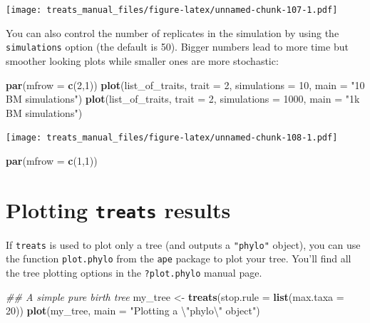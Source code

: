 \documentclass[
]{book}
\newenvironment{Shaded}{\begin{snugshade}}{\end{snugshade}}
\newcommand{\CharTok}[1]{\textcolor[rgb]{0.31,0.60,0.02}{#1}}
\newcommand{\CommentTok}[1]{\textcolor[rgb]{0.56,0.35,0.01}{\textit{#1}}}
\newcommand{\DataTypeTok}[1]{\textcolor[rgb]{0.13,0.29,0.53}{#1}}
\newcommand{\DecValTok}[1]{\textcolor[rgb]{0.00,0.00,0.81}{#1}}
\newcommand{\KeywordTok}[1]{\textcolor[rgb]{0.13,0.29,0.53}{\textbf{#1}}}
\newcommand{\NormalTok}[1]{#1}
\newcommand{\StringTok}[1]{\textcolor[rgb]{0.31,0.60,0.02}{#1}}
\begin{document}
\texttt{[image: treats\_manual\_files/figure-latex/unnamed-chunk-107-1.pdf]}

You can also control the number of replicates in the simulation by using the \texttt{simulations} option (the default is 50).
Bigger numbers lead to more time but smoother looking plots while smaller ones are more stochastic:

\begin{Shaded}
\begin{Highlighting}[]
\KeywordTok{par}\NormalTok{(}\DataTypeTok{mfrow =} \KeywordTok{c}\NormalTok{(}\DecValTok{2}\NormalTok{,}\DecValTok{1}\NormalTok{))}
\KeywordTok{plot}\NormalTok{(list\_of\_traits, }\DataTypeTok{trait =} \DecValTok{2}\NormalTok{, }\DataTypeTok{simulations =} \DecValTok{10}\NormalTok{, }\DataTypeTok{main =} \StringTok{"10 BM simulations"}\NormalTok{)}
\KeywordTok{plot}\NormalTok{(list\_of\_traits, }\DataTypeTok{trait =} \DecValTok{2}\NormalTok{, }\DataTypeTok{simulations =} \DecValTok{1000}\NormalTok{, }\DataTypeTok{main =} \StringTok{"1k BM simulations"}\NormalTok{)}
\end{Highlighting}
\end{Shaded}

\texttt{[image: treats\_manual\_files/figure-latex/unnamed-chunk-108-1.pdf]}

\begin{Shaded}
\begin{Highlighting}[]
\KeywordTok{par}\NormalTok{(}\DataTypeTok{mfrow =} \KeywordTok{c}\NormalTok{(}\DecValTok{1}\NormalTok{,}\DecValTok{1}\NormalTok{))}
\end{Highlighting}
\end{Shaded}

\hypertarget{plotting-treats-results}{%
\section{\texorpdfstring{Plotting \texttt{treats} results}{Plotting treats results}}\label{plotting-treats-results}}

If \texttt{treats} is used to plot only a tree (and outputs a \texttt{"phylo"} object), you can use the function \texttt{plot.phylo} from the \texttt{ape} package to plot your tree.
You'll find all the tree plotting options in the \texttt{?plot.phylo} manual page.

\begin{Shaded}
\begin{Highlighting}[]
\CommentTok{\#\# A simple pure birth tree}
\NormalTok{my\_tree \textless{}{-}}\StringTok{ }\KeywordTok{treats}\NormalTok{(}\DataTypeTok{stop.rule =} \KeywordTok{list}\NormalTok{(}\DataTypeTok{max.taxa =} \DecValTok{20}\NormalTok{))}
\KeywordTok{plot}\NormalTok{(my\_tree, }\DataTypeTok{main =} \StringTok{"Plotting a }\CharTok{\textbackslash{}"}\StringTok{phylo}\CharTok{\textbackslash{}"}\StringTok{ object"}\NormalTok{)}
\end{Highlighting}
\end{Shaded}
\end{document}
